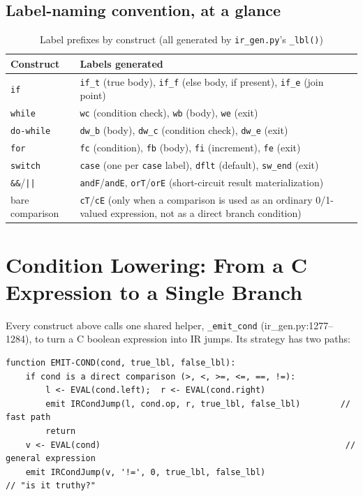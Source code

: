\documentclass[11pt,a4paper]{article}
\begin{document}
\subsection*{Label-naming convention, at a glance}
\begin{table}[h]
\centering
\caption{Label prefixes by construct (all generated by \texttt{ir\_gen.py}'s \texttt{\_lbl()})}
\small
\begin{tabular}{@{}p{2.2cm}p{9.6cm}@{}}
\toprule
Construct & Labels generated \\
\midrule
\texttt{if} & \texttt{if\_t} (true body), \texttt{if\_f} (else body, if present), \texttt{if\_e} (join point) \\
\texttt{while} & \texttt{wc} (condition check), \texttt{wb} (body), \texttt{we} (exit) \\
\texttt{do-while} & \texttt{dw\_b} (body), \texttt{dw\_c} (condition check), \texttt{dw\_e} (exit) \\
\texttt{for} & \texttt{fc} (condition), \texttt{fb} (body), \texttt{fi} (increment), \texttt{fe} (exit) \\
\texttt{switch} & \texttt{case} (one per \texttt{case} label), \texttt{dflt} (default), \texttt{sw\_end} (exit) \\
\texttt{\&\&}/\texttt{||} & \texttt{andF}/\texttt{andE}, \texttt{orT}/\texttt{orE} (short-circuit result materialization) \\
bare comparison & \texttt{cT}/\texttt{cE} (only when a comparison is used as an ordinary 0/1-valued expression, not as a direct branch condition) \\
\bottomrule
\end{tabular}
\end{table}

\section{Condition Lowering: From a C Expression to a Single Branch}

Every construct above calls one shared helper, \texttt{\_emit\_cond} (ir\_gen.py:1277--1284),
to turn a C boolean expression into IR jumps. Its strategy has two paths:

\begin{lstlisting}[style=pseudostyle, caption={\texttt{\_emit\_cond}, ir\_gen.py:1277--1284}]
function EMIT-COND(cond, true_lbl, false_lbl):
    if cond is a direct comparison (>, <, >=, <=, ==, !=):
        l <- EVAL(cond.left);  r <- EVAL(cond.right)
        emit IRCondJump(l, cond.op, r, true_lbl, false_lbl)        // fast path
        return
    v <- EVAL(cond)                                                 // general expression
    emit IRCondJump(v, '!=', 0, true_lbl, false_lbl)                 // "is it truthy?"
\end{lstlisting}
\end{document}
